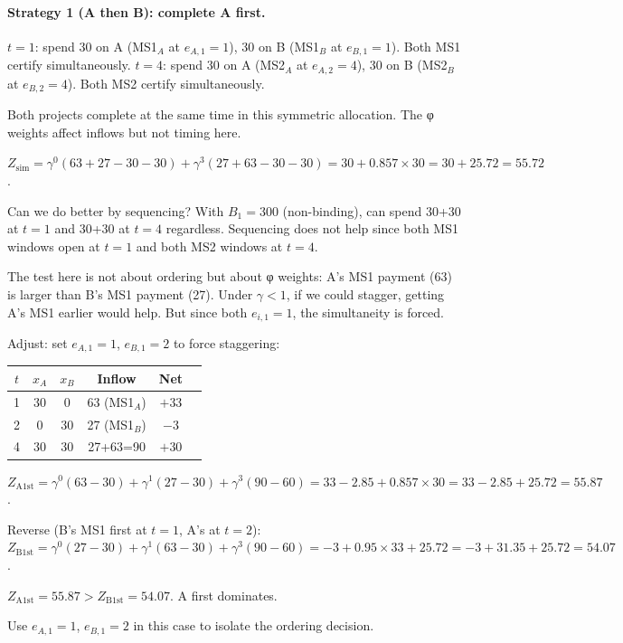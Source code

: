 \documentclass[11pt, a4paper]{article}
\begin{document}
\paragraph{Strategy 1 (A then B): complete A first.}
$t=1$: spend 30 on A (MS1$_A$ at $e_{A,1}=1$), 30 on B (MS1$_B$ at
$e_{B,1}=1$). Both MS1 certify simultaneously.
$t=4$: spend 30 on A (MS2$_A$ at $e_{A,2}=4$), 30 on B (MS2$_B$ at
$e_{B,2}=4$). Both MS2 certify simultaneously.

Both projects complete at the same time in this symmetric allocation.
The φ weights affect inflows but not timing here.

$Z_{\mathrm{sim}} = \gamma^0(63+27-30-30) + \gamma^3(27+63-30-30)
= 30 + 0.857\times30 = 30+25.72 = \mathbf{55.72}$.

Can we do better by sequencing? With $B_1=300$ (non-binding), can spend
30+30 at $t=1$ and 30+30 at $t=4$ regardless. Sequencing does not help
since both MS1 windows open at $t=1$ and both MS2 windows at $t=4$.

The test here is not about ordering but about φ weights: A's MS1
payment (63) is larger than B's MS1 payment (27). Under $\gamma<1$,
if we could stagger, getting A's MS1 earlier would help. But since
both $e_{i,1}=1$, the simultaneity is forced.

Adjust: set $e_{A,1}=1$, $e_{B,1}=2$ to force staggering:

\begin{center}
\begin{tabular}{cccccc}
\toprule
$t$ & $x_A$ & $x_B$ & Inflow & Net\\
\midrule
1 & 30 & 0  & 63 (MS1$_A$) & $+33$\\
2 &  0 & 30 & 27 (MS1$_B$) & $-3$\\
4 & 30 & 30 & 27+63=90    & $+30$\\
\bottomrule
\end{tabular}
\end{center}

$Z_{\mathrm{A1st}} = \gamma^0(63-30)+\gamma^1(27-30)+\gamma^3(90-60)
= 33-2.85+0.857\times30 = 33-2.85+25.72 = \mathbf{55.87}$.

Reverse (B's MS1 first at $t=1$, A's at $t=2$):
$Z_{\mathrm{B1st}} = \gamma^0(27-30)+\gamma^1(63-30)+\gamma^3(90-60)
= -3+0.95\times33+25.72 = -3+31.35+25.72 = \mathbf{54.07}$.

$Z_{\mathrm{A1st}}=55.87 > Z_{\mathrm{B1st}}=54.07$. A first dominates.

Use $e_{A,1}=1$, $e_{B,1}=2$ in this case to isolate the ordering
decision.
\end{document}
